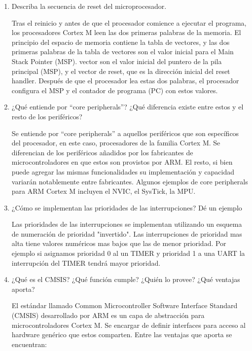 \documentclass[12pt, a4paper]{article}
\makeatletter
\newcommand\setItemnumber[1]{\setcounter{enum\romannumeral\@enumdepth}{\numexpr#1-1\relax}}
\makeatother
\begin{document}
\begin{enumerate}
    \setItemnumber{11} 
    \item Describa la secuencia de reset del microprocesador.
    
    Tras el reinicio y antes de que el procesador comience a ejecutar el programa, los procesadores 
    Cortex M leen las dos primeras palabras de la memoria. El principio del espacio de memoria contiene
    la tabla de vectores, y las dos primeras palabras de la tabla de vectores son el valor inicial para el 
    Main Stack Pointer (MSP). vector son el valor inicial del puntero de la pila principal (MSP), 
    y el vector de reset, que es la dirección inicial del reset handler. Después de que el procesador 
    lea estas dos palabras, el procesador configura el MSP y el contador de programa (PC) con estos 
    valores.
    
    \setItemnumber{12}
    \item ¿Qué entiende por ``core peripherals''? ¿Qué diferencia existe entre estos y 
    el resto de los periféricos?
    
    Se entiende por ``core peripherals'' a aquellos periféricos que son específicos del 
    procesador, en este caso, procesadores de la familia Cortex M. Se diferencian de los 
    periféricos añadidos por los fabricantes de microcontroladores en que estos son provistos 
    por ARM. El resto, si bien puede agregar las mismas funcionalidades su implementación y capacidad
    variarán notablemente entre fabricantes. Algunos ejemplos de core peripherals para ARM Cortex M 
    incluyen el NVIC, el SysTick, la MPU.
    
    \setItemnumber{13} 
   \item ¿Cómo se implementan las prioridades de las interrupciones? Dé un ejemplo
    
    Las prioridades de las interrupciones se implementan utilizando un esquema de numeración de prioridad 
    "invertido". Las interrupciones de prioridad mas alta tiene valores numéricos mas bajos que las de menor 
    prioridad. Por ejemplo si asignamos prioridad 0 al un TIMER y prioridad 1 a una UART la interrupción del
    TIMER tendrá mayor prioridad.
    
    \setItemnumber{14}
    \item ¿Qué es el CMSIS? ¿Qué función cumple? ¿Quién lo provee? ¿Qué ventajas aporta?
    
    El estándar llamado Common Microcontroller Software Interface Standard (CMSIS) desarrollado por 
    ARM es un capa de abstracción para microcontroladores Cortex M. Se encargar de definir interfaces
    para acceso al hardware genérico que estos comparten. Entre las ventajas que aporta se encuentran:
    

\end{enumerate}
\end{document}
